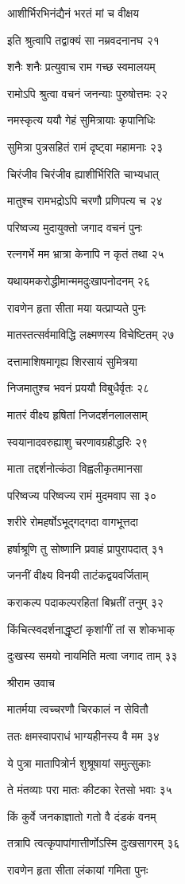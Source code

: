 आशीर्भिरभिनंद्यैनं भरतं मां च वीक्षय

इति श्रुत्वापि तद्वाक्यं सा नम्रवदनानघ २१

शनैः शनैः प्रत्युवाच राम गच्छ स्वमालयम्

रामोऽपि श्रुत्वा वचनं जनन्याः पुरुषोत्तमः २२

नमस्कृत्य ययौ गेहं सुमित्रायाः कृपानिधिः

सुमित्रा पुत्रसहितं रामं दृष्ट्वा महामनाः २३

चिरंजीव चिरंजीव ह्याशीर्भिरिति चाभ्यधात्

मातुश्च रामभद्रोऽपि चरणौ प्रणिपत्य च २४

परिष्वज्य मुदायुक्तो जगाद वचनं पुनः

रत्नगर्भे मम भ्रात्रा केनापि न कृतं तथा २५

यथायमकरोद्धीमान्ममदुःखापनोदनम् २६

रावणेन हृता सीता मया यत्प्राप्यते पुनः

मातस्तत्सर्वमाविद्धि लक्ष्मणस्य विचेष्टितम् २७

दत्तामाशिषमागृह्य शिरसायं सुमित्रया

निजमातुश्च भवनं प्रययौ विबुधैर्वृतः २८

मातरं वीक्ष्य हृषितां निजदर्शनलालसाम्

स्वयानादवरुह्याशु चरणावग्रहीद्धरिः २९

माता तद्दर्शनोत्कंठा विह्वलीकृतमानसा

परिष्वज्य परिष्वज्य रामं मुदमवाप सा ३०

शरीरे रोमहर्षोऽभूद्गद्गदा वागभूत्तदा

हर्षाश्रूणि तु सोष्णानि प्रवाहं प्रापुरापदात् ३१

जननीं वीक्ष्य विनयी ताटंकद्वयवर्जिताम्

कराकल्प पदाकल्परहितां बिभ्रतीं तनुम् ३२

किंचित्स्वदर्शनाद्धृष्टां कृशांगीं तां स शोकभाक्

दुःखस्य समयो नायमिति मत्वा जगाद ताम् ३३

श्रीराम उवाच

मातर्मया त्वच्चरणौ चिरकालं न सेवितौ

ततः क्षमस्वापराधं भाग्यहीनस्य वै मम ३४

ये पुत्रा मातापित्रोर्न शुश्रूषायां समुत्सुकाः

ते मंतव्याः परा मातः कीटका रेतसो भवाः ३५

किं कुर्वे जनकाज्ञातो गतो वै दंडकं वनम्

तत्रापि त्वत्कृपापांगात्तीर्णोऽस्मि दुःखसागरम् ३६

रावणेन हृता सीता लंकायां गमिता पुनः

